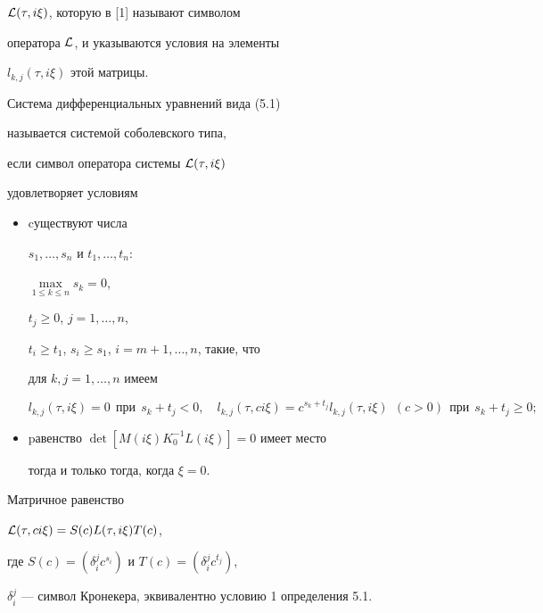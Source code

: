 ${\cal L}(\tau, i\xi)$, которую в [1] называют символом


оператора ${\cal L}$, и указываются условия на элементы


$l_{k,j}(\tau, i\xi)$ этой матрицы.





\begin{defns}


Система дифференциальных уравнений вида (5.1)


называется системой соболевского типа,


если символ оператора системы ${\cal L}(\tau, i\xi)$


удовлетворяет условиям


\begin{itemize}


\item[1.] cуществуют числа


$s_1,\dotsc,s_n$ и $t_1,\dotsc,t_n$:


$\max\limits_{1 \leq k\leq n}s_k=0$,


$t_j\geq0$, $j=1,\dotsc,n$,


$t_i\geq t_1$, $s_i\geq s_1$, $i=m+1,\dotsc,n$, такие, что


для $k,j=1,\dotsc,n$ имеем


$$


l_{k,j}(\tau,i\xi)=0 \ \ \text{при} \ \ s_k+t_j<0,\quad


l_{k,j}(\tau,ci\xi)=c^{s_k+t_j}l_{k,j}(\tau,i\xi)\ \ (c>0)


\ \ \text{при} \ \ s_k+t_j\geq 0;


$$


\item[2.] pавенство $\det [M(i\xi)K^{-1}_0L(i\xi)]=0$ имеет место


тогда и только тогда, когда $\xi=0$.


\end{itemize}


\end{defns}





Матричное равенство


${\cal L}(\tau,ci\xi)=S(c)L(\tau,i\xi)T(c)$,


где $S(c)=(\delta^j_ic^{s_i})$ и $T(c)=(\delta^j_ic^{t_j})$,


$\delta^j_i$ --- символ Кронекера, эквивалентно условию 1 определения 5.1.





